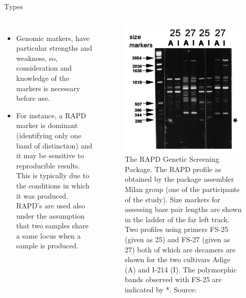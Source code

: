 \documentclass[11pt,dvipsnames,ignorenonframetext,aspectratio=169]{beamer}
\providecommand{\tightlist}{%
  \setlength{\itemsep}{0pt}\setlength{\parskip}{0pt}}
\newcommand{\bcolumns}{\begin{columns}[T, onlytextwidth]}
\newcommand{\ecolumns}{\end{columns}}
\begin{document}
\begin{frame}{Types}
\protect\hypertarget{types}{}
\bcolumns
{}
\footnotesize

\begin{itemize}
\tightlist
\item
  Genomic markers, have particular strengths and weakness, so,
  consideration and knowledge of the markers is necessary before use.
\item
  For instance, a RAPD marker is dominant (identifying only one band of
  distinction) and it may be sensitive to reproducible results. This is
  typically due to the conditions in which it was produced. RAPD's are
  used also under the assumption that two samples share a same locus
  when a sample is produced.
\end{itemize}


\begin{figure}
\includegraphics[width=0.5\linewidth]{../images/rapd_marker_diagram} \caption{The RAPD Genetic Screening Package. The RAPD profile as obtained by the package assembler Milan group (one of the participants of the study). Size markers for assessing base pair lengths are shown in the ladder of the far left track. Two profiles using primers FS-25 (given as 25) and FS-27 (given as 27) both of which are decamers are shown for the two cultivars Adige (A) and I-214 (I). The polymorphic bands observed with FS-25 are indicated by *. Source: \cite{jones1997reproducibility}}\label{fig:rapd-markers}
\end{figure}

\ecolumns
\end{frame}
\end{document}
